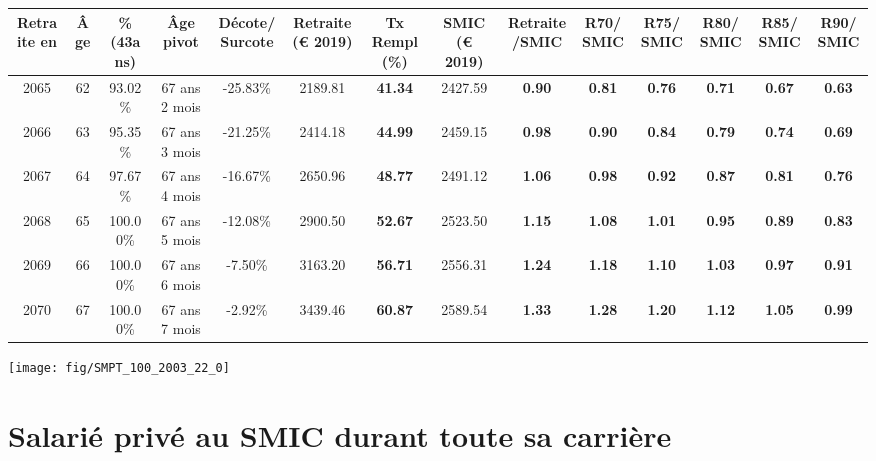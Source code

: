 \begin{adjustbox}{max width=\textwidth} 
\begin{tabular}[htb]{|c|c||c|c|c||c|c||c|c||c|c|c|c|c|} 
\hline 
 Retraite en &  Âge &  \%(43ans) &  Âge pivot &  Décote/Surcote &  Retraite (\euro{} 2019) &  Tx Rempl(\%) &  SMIC (\euro{} 2019) &  Retraite/SMIC &  R70/SMIC &  R75/SMIC &  R80/SMIC &  R85/SMIC &  R90/SMIC \\ 
\hline \hline 
 2065 &  62 &  93.02\% &  67 ans 2 mois &  -25.83\% &  2189.81 &  {\bf 41.34} &  2427.59 &  {\bf {\color{red} 0.90}} &  {\bf {\color{red} 0.81}} &  {\bf {\color{red} 0.76}} &  {\bf {\color{red} 0.71}} &  {\bf {\color{red} 0.67}} &  {\bf {\color{red} 0.63}} \\ 
\hline 
 2066 &  63 &  95.35\% &  67 ans 3 mois &  -21.25\% &  2414.18 &  {\bf 44.99} &  2459.15 &  {\bf {\color{red} 0.98}} &  {\bf {\color{red} 0.90}} &  {\bf {\color{red} 0.84}} &  {\bf {\color{red} 0.79}} &  {\bf {\color{red} 0.74}} &  {\bf {\color{red} 0.69}} \\ 
\hline 
 2067 &  64 &  97.67\% &  67 ans 4 mois &  -16.67\% &  2650.96 &  {\bf 48.77} &  2491.12 &  {\bf 1.06} &  {\bf {\color{red} 0.98}} &  {\bf {\color{red} 0.92}} &  {\bf {\color{red} 0.87}} &  {\bf {\color{red} 0.81}} &  {\bf {\color{red} 0.76}} \\ 
\hline 
 2068 &  65 &  100.00\% &  67 ans 5 mois &  -12.08\% &  2900.50 &  {\bf 52.67} &  2523.50 &  {\bf 1.15} &  {\bf 1.08} &  {\bf 1.01} &  {\bf {\color{red} 0.95}} &  {\bf {\color{red} 0.89}} &  {\bf {\color{red} 0.83}} \\ 
\hline 
 2069 &  66 &  100.00\% &  67 ans 6 mois &  -7.50\% &  3163.20 &  {\bf 56.71} &  2556.31 &  {\bf 1.24} &  {\bf 1.18} &  {\bf 1.10} &  {\bf 1.03} &  {\bf {\color{red} 0.97}} &  {\bf {\color{red} 0.91}} \\ 
\hline 
 2070 &  67 &  100.00\% &  67 ans 7 mois &  -2.92\% &  3439.46 &  {\bf 60.87} &  2589.54 &  {\bf 1.33} &  {\bf 1.28} &  {\bf 1.20} &  {\bf 1.12} &  {\bf 1.05} &  {\bf {\color{red} 0.99}} \\ 
\hline 
\hline 
\end{tabular} 
\end{adjustbox} 
 
 \vspace{0.1cm} 

 {\hspace{-2.2cm}\texttt{[image: fig/SMPT\_100\_2003\_22\_0]}} 

\newpage 
 
\chapter{Salarié privé au SMIC durant toute sa carrière} 

